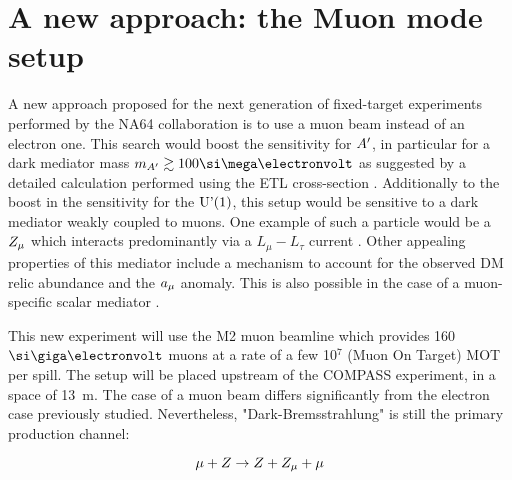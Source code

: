 \FloatBarrier\noindent
\section{A new approach: the Muon mode setup}
\label{ch5:sec:muon-mode-setup}

A new approach proposed for the next generation of fixed-target experiments performed by the NA64 collaboration is to use a muon beam instead of an electron one. This search would boost the sensitivity for $A'$, in particular for a dark mediator mass $m_{\DM} \gtrsim 100 \mev$ as suggested by a detailed calculation performed using the ETL cross-section \cite{Gninenko:2019qiv}. Additionally to the boost in the sensitivity for the $\textrm{U'(1)}$, this setup would be sensitive to a dark mediator weakly coupled to muons. One example of such a particle would be a $Z_{\mu}$ which interacts predominantly via a $L_{\mu} - L_{\tau}$ current \cite{krasnikov2017muon,GNINENKO2001119}. Other appealing properties of this mediator include a mechanism to account for the observed DM relic abundance \cite{GNINENKO2001119,Kirpichnikov:2020tcf,PhysRevLett.121.011102} and the $a_{\mu}$ anomaly. This is also possible in the case of a muon-specific scalar mediator \cite{krasnikov2017light,PhysRevD.95.115005}.

This new experiment will use the M2 muon beamline which provides 160 $\gev$ muons at a rate of a few 10$^7$ (Muon On Target) MOT per spill. The setup will be placed upstream of the COMPASS experiment, in a space of \SI{13}{\meter}. The case of a muon beam differs significantly from the electron case previously studied. Nevertheless, "Dark-Bremsstrahlung" is still the primary production channel:

\begin{equation}
  \label{eq:dm-muon-int}
  \mu + Z \to Z + Z_{\mu} + \mu
\end{equation}


